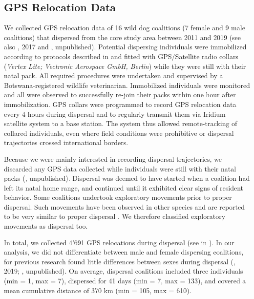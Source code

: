 \documentclass[abstract=on,10pt,a4paper,bibliography=totocnumbered]{scrartcl}
\begin{document}
\subsection{GPS Relocation Data}
We collected GPS relocation data of 16 wild dog coalitions (7 female and 9
male coalitions) that dispersed from the core study area between 2011 and 2019
(see also \citeauthor{Abrahms.2017}, 2017 and \citeauthor{Cozzi.2020},
unpublished). Potential dispersing individuals were immobilized according to
protocols described in \cite{Osofsky.1996} and fitted with GPS/Satellite radio
collars (\textit{Vertex Lite; Vectronic Aerospace GmbH, Berlin}) while they were
still with their natal pack. All required procedures were undertaken and
supervised by a Botswana-registered wildlife veterinarian. Immobilized
individuals were monitored and all were observed to successfully re-join their
packs within one hour after immobilization. GPS collars were programmed to
record GPS relocation data every 4 hours during dispersal and to regularly
transmit them via Iridium satellite system to a base station. The system thus
allowed remote-tracking of collared individuals, even where field conditions
were prohibitive or dispersal trajectories crossed international borders.

Because we were mainly interested in recording dispersal trajectories, we
discarded any GPS data collected while individuals were still with their natal
packs (\citeauthor{Cozzi.2020}, unpublished). Dispersal was deemed to have
started when a coalition had left its natal home range, and continued until it
exhibited clear signs of resident behavior. Some coalitions undertook
exploratory movements prior to proper dispersal. Such movements have been
observed in other species and are reported to be very similar to proper
dispersal \citep{Killeen.2014}. We therefore classified exploratory movements as
dispersal too.

In total, we collected 4'691 GPS relocations during dispersal (see
 in ). In our analysis, we did not
differentiate between male and female dispersing coalitions, for previous
research found little differences between sexes during dispersal
(\citeauthor{Woodroffe.2019}, 2019; \citeauthor{Cozzi.2020}, unpublished). On
average, dispersal coalitions included three individuals (min = 1, max = 7),
dispersed for 41 days (min = 7, max = 133), and covered a mean cumulative
distance of 370 km (min = 105, max = 610).
\end{document}
